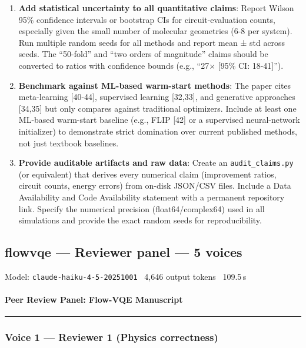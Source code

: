 \documentclass[10pt,letterpaper]{article}
\begin{document}
\begin{enumerate}
\def\labelenumi{\arabic{enumi}.}
\item
  \textbf{Add statistical uncertainty to all quantitative claims}: Report Wilson 95\% confidence intervals or bootstrap CIs for circuit-evaluation counts, especially given the small number of molecular geometries (6-8 per system). Run multiple random seeds for all methods and report mean ± std across seeds. The ``50-fold'' and ``two orders of magnitude'' claims should be converted to ratios with confidence bounds (e.g., ``27× {[}95\% CI: 18-41{]}'').
\item
  \textbf{Benchmark against ML-based warm-start methods}: The paper cites meta-learning {[}40-44{]}, supervised learning {[}32,33{]}, and generative approaches {[}34,35{]} but only compares against traditional optimizers. Include at least one ML-based warm-start baseline (e.g., FLIP {[}42{]} or a supervised neural-network initializer) to demonstrate strict domination over current published methods, not just textbook baselines.
\item
  \textbf{Provide auditable artifacts and raw data}: Create an \texttt{audit\_claims.py} (or equivalent) that derives every numerical claim (improvement ratios, circuit counts, energy errors) from on-disk JSON/CSV files. Include a Data Availability and Code Availability statement with a permanent repository link. Specify the numerical precision (float64/complex64) used in all simulations and provide the exact random seeds for reproducibility.
\end{enumerate}


\subsection{flowvqe --- Reviewer panel — 5 voices}
\noindent\textcolor{muted}{\small Model: \texttt{claude-haiku-4-5-20251001} \textperiodcentered\ 4,646 output tokens \textperiodcentered\ 109.5\,s}

\hypertarget{peer-review-panel-flow-vqe-manuscript}{%
\paragraph{Peer Review Panel: Flow-VQE Manuscript}\label{peer-review-panel-flow-vqe-manuscript}}

\begin{center}\rule{0.5\linewidth}{0.5pt}\end{center}

\hypertarget{voice-1-reviewer-1-physics-correctness}{%
\subsubsection{Voice 1 --- Reviewer 1 (Physics correctness)}\label{voice-1-reviewer-1-physics-correctness}}
\end{document}
